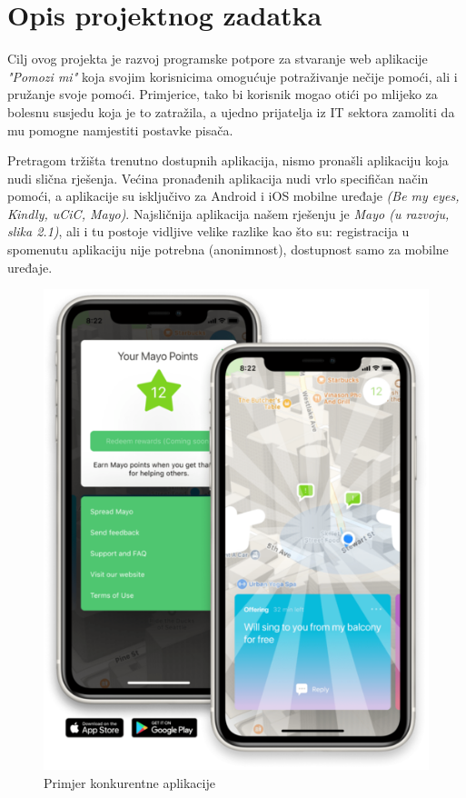 \chapter{Opis projektnog zadatka}


Cilj ovog projekta je razvoj programske potpore za stvaranje web aplikacije \textit{"Pomozi mi"} koja svojim korisnicima omogućuje potraživanje nečije pomoći, ali i pružanje svoje pomoći. 
Primjerice, tako bi korisnik mogao otići po mlijeko za bolesnu susjedu koja je to zatražila, a ujedno prijatelja iz IT sektora zamoliti da mu pomogne namjestiti postavke pisača. 

Pretragom tržišta trenutno dostupnih aplikacija, nismo pronašli aplikaciju koja nudi slična rješenja. Većina pronađenih aplikacija nudi vrlo specifičan način pomoći, a aplikacije su isključivo za Android i iOS mobilne uređaje \textit{(Be my eyes, Kindly, uCiC, Mayo)}. Najsličnija aplikacija našem rješenju je \textit{Mayo (u razvoju, slika 2.1)}, ali i tu postoje vidljive velike razlike kao što su: registracija u spomenutu aplikaciju nije potrebna (anonimnost), dostupnost samo za mobilne uređaje.\\


\begin{figure}[H]
	\includegraphics[scale=0.2]{slike/mayo-hero.PNG} %
	\centering
	\caption{Primjer konkurentne aplikacije}
\end{figure}

